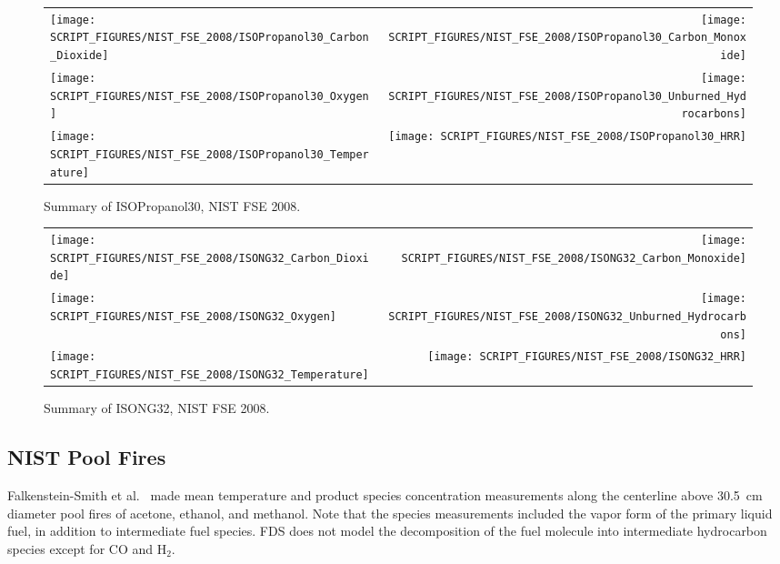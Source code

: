 \begin{figure}[p]
\begin{tabular*}{\textwidth}{l@{\extracolsep{\fill}}r}
\texttt{[image: SCRIPT\_FIGURES/NIST\_FSE\_2008/ISOPropanol30\_Carbon\_Dioxide]} &
\texttt{[image: SCRIPT\_FIGURES/NIST\_FSE\_2008/ISOPropanol30\_Carbon\_Monoxide]} \\
\texttt{[image: SCRIPT\_FIGURES/NIST\_FSE\_2008/ISOPropanol30\_Oxygen]} &
\texttt{[image: SCRIPT\_FIGURES/NIST\_FSE\_2008/ISOPropanol30\_Unburned\_Hydrocarbons]} \\
\texttt{[image: SCRIPT\_FIGURES/NIST\_FSE\_2008/ISOPropanol30\_Temperature]} &
\texttt{[image: SCRIPT\_FIGURES/NIST\_FSE\_2008/ISOPropanol30\_HRR]}
\end{tabular*}
\caption[Summary of ISOPropanol30, NIST FSE 2008]{Summary of ISOPropanol30, NIST FSE 2008.}
\label{NIST_FSE_1994_ISOPropanol30}
\end{figure}

\begin{figure}[p]
\begin{tabular*}{\textwidth}{l@{\extracolsep{\fill}}r}
\texttt{[image: SCRIPT\_FIGURES/NIST\_FSE\_2008/ISONG32\_Carbon\_Dioxide]} &
\texttt{[image: SCRIPT\_FIGURES/NIST\_FSE\_2008/ISONG32\_Carbon\_Monoxide]} \\
\texttt{[image: SCRIPT\_FIGURES/NIST\_FSE\_2008/ISONG32\_Oxygen]} &
\texttt{[image: SCRIPT\_FIGURES/NIST\_FSE\_2008/ISONG32\_Unburned\_Hydrocarbons]} \\
\texttt{[image: SCRIPT\_FIGURES/NIST\_FSE\_2008/ISONG32\_Temperature]} &
\texttt{[image: SCRIPT\_FIGURES/NIST\_FSE\_2008/ISONG32\_HRR]}
\end{tabular*}
\caption[Summary of ISONG32, NIST FSE 2008]{Summary of ISONG32, NIST FSE 2008.}
\label{NIST_FSE_1994_ISONG32}
\end{figure}


\clearpage

\subsection{NIST Pool Fires}
\label{sec:NIST_Pool_Fires}

Falkenstein-Smith et al.~\cite{Falkenstein-Smith:2019} made mean temperature and product species concentration measurements along the centerline above 30.5~cm diameter pool fires of acetone, ethanol, and methanol. Note that the species measurements included the vapor form of the primary liquid fuel, in addition to intermediate fuel species. FDS does not model the decomposition of the fuel molecule into intermediate hydrocarbon species except for CO and H$_2$.

